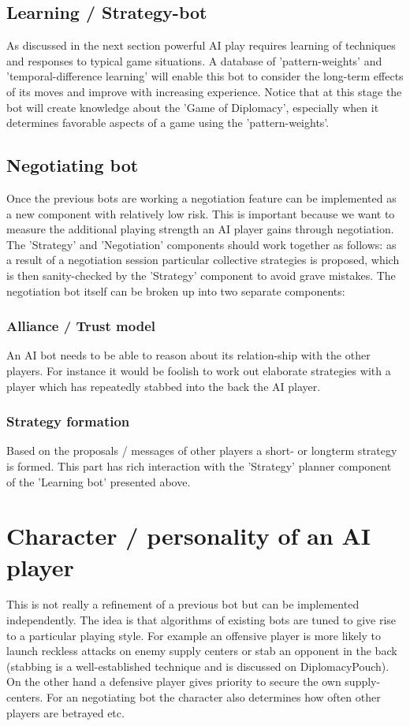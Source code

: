 \documentclass[12pt]{article}
\begin{document}
\begin{itemize}
{\subsection{Learning / Strategy-bot}
As discussed in the next section powerful AI play requires learning of
techniques and responses to typical game situations. A database of 
'pattern-weights' and 'temporal-difference learning' will enable this bot to consider the
long-term effects of its moves and improve with increasing experience. Notice
that at this stage the bot will create knowledge about the 'Game of
Diplomacy', especially when it determines favorable aspects of a game using
the 'pattern-weights'.

\subsection{Negotiating bot}
Once the previous bots are working a negotiation feature can be implemented
as a new component with relatively low risk. This is important because we
want to measure the additional playing strength an AI player gains through
negotiation. The 'Strategy' and 'Negotiation' components should work together as
follows:  as a result of a negotiation session particular collective strategies
is proposed, which is then sanity-checked by the 'Strategy' component to avoid grave mistakes. 
The negotiation bot itself can be broken up into two separate components:

\subsubsection{Alliance / Trust model}
An AI bot needs to be able to reason about its relation-ship with the other
players. For instance it would be foolish to work out elaborate strategies
with a player which has repeatedly stabbed into the back the AI player. 

\subsubsection{Strategy formation}
Based on the proposals / messages of other players a short- or longterm
strategy is formed. This part has rich interaction with the 'Strategy'
planner component of the 'Learning bot' presented above.

\section{Character / personality of an AI player}
This is not really a refinement of a previous bot but can be implemented 
independently. The idea is that algorithms of existing bots are tuned to 
give rise to a particular playing style. For example an offensive player
is more likely to launch reckless attacks on enemy supply centers or stab
an opponent in the back (stabbing is a well-established technique and is
discussed on DiplomacyPouch). On the other hand a defensive player gives
priority to secure the own supply-centers. For an negotiating bot the
character also determines how often other players are betrayed etc.

}
\end{itemize}
\end{document}
